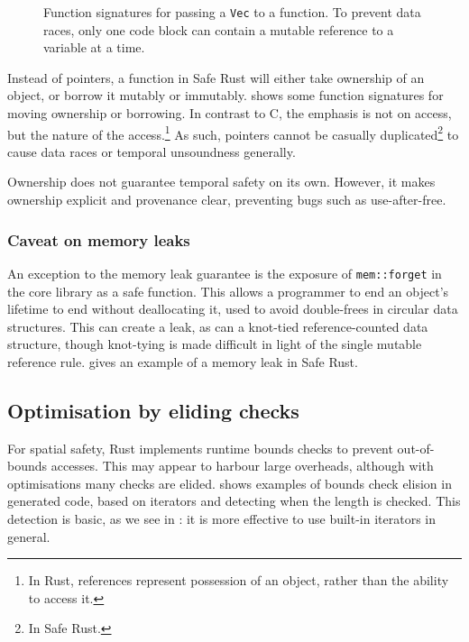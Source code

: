 \documentclass[dissertation.tex]{subfiles}
\begin{document}
\begin{figure}[ht]
    
    \caption{
        Function signatures for passing a \texttt{Vec} to a function.
        To prevent data races, only one code block can contain a mutable
        reference to a variable at a time.
    }
    \label{lst:rust-ownership}
\end{figure}

Instead of pointers, a function in Safe Rust will either take ownership
of an object, or borrow it mutably or immutably.
 shows some function signatures for
moving ownership or borrowing.
In contrast to C, the emphasis is not on access, but the nature of the
access.\footnote{In Rust, references represent possession of an object,
rather than the ability to access it.}
As such, pointers cannot be casually duplicated\footnote{In Safe Rust.}
to cause data races or temporal unsoundness generally.

Ownership does not guarantee temporal safety on its own.
However, it makes ownership explicit and provenance clear, preventing
bugs such as use-after-free.

\subsubsection{Caveat on memory leaks}
An exception to the memory leak guarantee is the exposure of
\texttt{mem::forget} in the core library as a safe function.
This allows a programmer to end an object's lifetime to end without
deallocating it, used to avoid double-frees in circular data structures.
This can create a leak, as can a knot-tied reference-counted data
structure, though knot-tying is made difficult in light of the single
mutable reference rule.
 gives an example of a memory leak in
Safe Rust.


\subsection{Optimisation by eliding checks}
\label{sec:rust-elision}

For spatial safety, Rust implements runtime bounds checks to
prevent out-of-bounds accesses.
This may appear to harbour large overheads, although with optimisations
many checks are elided.
 shows examples of bounds check elision in
generated code, based on iterators and detecting when the length is
checked.
This detection is basic, as we see in : it
is more effective to use built-in iterators in general.
\end{document}
